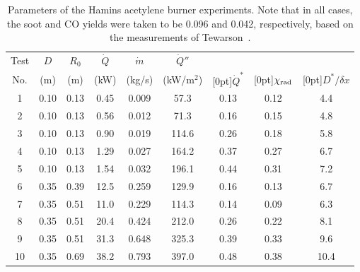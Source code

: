 \begin{table}[ht]
\centering
\caption[Parameters of the Hamins acetylene burner experiments]{Parameters of the Hamins acetylene burner experiments. Note that in all cases, the soot and CO yields were taken to be 0.096 and 0.042, respectively, based on the measurements of Tewarson~\cite{SFPE:Tewarson}.}
\begin{tabular}{|c|c|c|c|c|c|c||c|c|}
\hline
Test     & $D$      & $R_0$      & $\dot{Q}$   &  $\dot{m}$            &  $\dot{Q}''$   &               &         &             \\
No.      & (m)      & (m)        & (kW)        &  (kg/s)               &  (kW/m$^2$)    & \raisebox{1.5ex}[0pt]{$\dot{Q}^*$} & \raisebox{1.5ex}[0pt]{$\chi_{\rm rad}$} & \raisebox{1.5ex}[0pt]{$D^*/\delta x$} \\ \hline \hline
1        & 0.10     & 0.13       & 0.45        &  0.009                &  57.3          & 0.13         & 0.12     & 4.4             \\ \hline
2        & 0.10     & 0.13       & 0.56        &  0.012                &  71.3          & 0.16         & 0.15     & 4.8             \\ \hline
3        & 0.10     & 0.13       & 0.90        &  0.019                &  114.6         & 0.26         & 0.18     & 5.8             \\ \hline
4        & 0.10     & 0.13       & 1.29        &  0.027                &  164.2         & 0.37         & 0.27     & 6.7             \\ \hline
5        & 0.10     & 0.13       & 1.54        &  0.032                &  196.1         & 0.44         & 0.31     & 7.2             \\ \hline
6        & 0.35     & 0.39       & 12.5        &  0.259                &  129.9         & 0.16         & 0.13     & 6.7             \\ \hline
7        & 0.35     & 0.51       & 11.0        &  0.229                &  114.3         & 0.14         & 0.09     & 6.3             \\ \hline
8        & 0.35     & 0.51       & 20.4        &  0.424                &  212.0         & 0.26         & 0.22     & 8.1             \\ \hline
9        & 0.35     & 0.51       & 31.3        &  0.648                &  325.3         & 0.39         & 0.33     & 9.6             \\ \hline
10       & 0.35     & 0.69       & 38.2        &  0.793                &  397.0         & 0.48         & 0.38     & 10.4             \\ \hline

\end{tabular}
\end{table}
